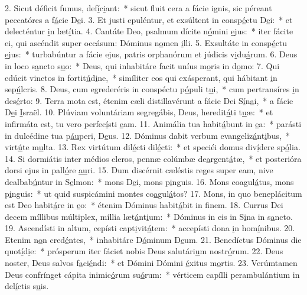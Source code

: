 2. Sicut déficit fumus, def\uline{í}c\uline{i}ant:~* sicut fluit cera a fácie ignis, sic péreant peccatóres a f\uline{á}cie D\uline{e}i.
3. Et justi epuléntur, et exsúltent in consp\uline{é}ctu D\uline{e}i:~* et delecténtur \uline{i}n læt\uline{í}tia.
4. Cantáte Deo, psalmum dícite n\uline{ó}mini \uline{e}jus:~* iter fácite ei, qui ascéndit super occásum: Dóminus n\uline{o}men \uline{i}lli.
5. Exsultáte in consp\uline{é}ctu \uline{e}jus:~* turbabúntur a fácie ejus, patris orphanórum et júdicis v\uline{i}du\uline{á}rum.
6. Deus in loco s\uline{a}ncto s\uline{u}o:~* Deus, qui inhabitáre facit uníus m\uline{o}ris in d\uline{o}mo:
7. Qui edúcit vinctos in fortit\uline{ú}d\uline{i}ne,~* simíliter eos qui exásperant, qui hábitant \uline{i}n sep\uline{ú}lcris.
8. Deus, cum egrederéris in conspéctu p\uline{ó}puli t\uline{u}i,~* cum pertransíres \uline{i}n des\uline{é}rto:
9. Terra mota est, étenim cæli distillavérunt a fácie Dei S\uline{í}n\uline{a}i,~* a fácie D\uline{e}i \uline{I}sraël.
10. Plúviam voluntáriam segregábis, Deus, heredit\uline{á}ti t\uline{u}æ:~* et infirmáta est, tu vero perfec\uline{í}sti \uline{e}am.
11. Animália tua habit\uline{á}bunt in \uline{e}a:~* parásti in dulcédine tua p\uline{áu}peri, D\uline{e}us.
12. Dóminus dabit verbum evangeliz\uline{á}nt\uline{i}bus,~* virt\uline{ú}te m\uline{u}lta.
13. Rex virtútum dil\uline{é}cti dil\uline{é}cti:~* et speciéi domus div\uline{í}dere sp\uline{ó}lia.
14. Si dormiátis inter médios cleros, pennæ colúmbæ de\uline{a}rgent\uline{á}tæ,~* et posterióra dorsi ejus in pall\uline{ó}re \uline{au}ri.
15. Dum discérnit cæléstis reges super eam, nive dealbab\uline{ú}ntur in S\uline{e}lmon:~* mons D\uline{e}i, mons p\uline{i}nguis.
16. Mons coagul\uline{á}tus, mons p\uline{i}nguis:~* ut quid suspicámini montes co\uline{a}gul\uline{á}tos?
17. Mons, in quo beneplácitum est Deo habit\uline{á}re in \uline{e}o:~* étenim Dóminus habit\uline{á}bit in f\uline{i}nem.
18. Currus Dei decem míllibus múltiplex, míllia læt\uline{á}nt\uline{i}um:~* Dóminus in eis in S\uline{i}na in s\uline{a}ncto.
19. Ascendísti in altum, cepísti capt\uline{i}vit\uline{á}tem:~* accepísti dona \uline{i}n hom\uline{í}nibus.
20. Etenim n\uline{o}n cred\uline{é}ntes,~* inhabitáre D\uline{ó}minum D\uline{e}um.
21. Benedíctus Dóminus die quot\uline{í}d\uline{i}e:~* prósperum iter fáciet nobis Deus salutári\uline{u}m nostr\uline{ó}rum.
22. Deus noster, Deus salvos f\uline{a}ci\uline{é}ndi:~* et Dómini Dómini \uline{é}xitus m\uline{o}rtis.
23. Verúmtamen Deus confrínget cápita inimic\uline{ó}rum su\uline{ó}rum:~* vérticem capílli perambulántium in del\uline{í}ctis s\uline{u}is.
